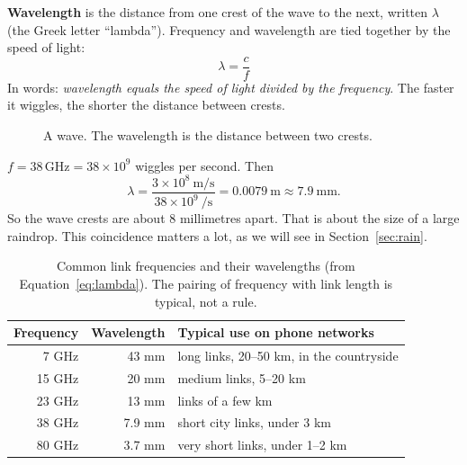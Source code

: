 \documentclass[11pt,a4paper]{article}
\begin{document}
\textbf{Wavelength} is the distance from one crest of the wave to the next, written
$\lambda$ (the Greek letter ``lambda''). Frequency and wavelength are tied together by the speed of light:
\begin{equation}
\lambda = \frac{c}{f}
\label{eq:lambda}
\end{equation}
In words: \emph{wavelength equals the speed of light divided by the frequency}. The faster it wiggles,
the shorter the distance between crests.

\begin{figure}[h]
\centering
{}
\caption{A wave. The wavelength is the distance between two crests.}
\end{figure}

\begin{example}
$f = 38\,\text{GHz} = 38\times10^{9}$ wiggles per second. Then
\[
\lambda = \frac{3\times10^{8}\ \text{m/s}}{38\times10^{9}\ \text{/s}} = 0.0079\ \text{m} \approx 7.9\ \text{mm}.
\]
So the wave crests are about 8 millimetres apart. That is about the size of a large raindrop. This
coincidence matters a lot, as we will see in Section~\ref{sec:rain}.
\end{example}

\begin{table}[h]
\centering\small
\begin{tabular}{rrl}
\toprule
Frequency & Wavelength & Typical use on phone networks \\
\midrule
7 GHz & 43 mm & long links, 20--50 km, in the countryside \\
15 GHz & 20 mm & medium links, 5--20 km \\
23 GHz & 13 mm & links of a few km \\
38 GHz & 7.9 mm & short city links, under 3 km \\
80 GHz & 3.7 mm & very short links, under 1--2 km \\
\bottomrule
\end{tabular}
\caption{Common link frequencies and their wavelengths (from Equation~\ref{eq:lambda}). The
pairing of frequency with link length is typical, not a rule.}
\label{tab:freq}
\end{table}
\end{document}
